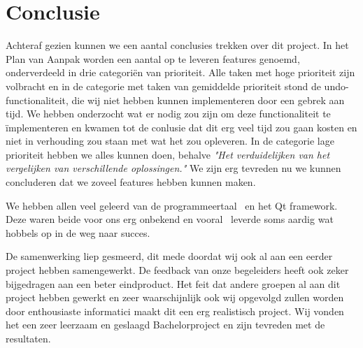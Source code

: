 \section{Conclusie}
Achteraf gezien kunnen we een aantal conclusies trekken over dit project. In het Plan van Aanpak worden een aantal op te leveren features genoemd, onderverdeeld in drie categori\"en van prioriteit. Alle taken met hoge prioriteit zijn volbracht en in de categorie met taken van gemiddelde prioriteit stond de undo-functionaliteit, die wij niet hebben kunnen implementeren door een gebrek aan tijd. We hebben onderzocht wat er nodig zou zijn om deze functionaliteit te \"implementeren en kwamen tot de conlusie dat dit erg veel tijd zou gaan kosten en niet in verhouding zou staan met wat het zou opleveren. In de categorie lage prioriteit hebben we alles kunnen doen, behalve \emph{"Het verduidelijken van het vergelijken van verschillende oplossingen."} We zijn erg tevreden nu we kunnen concluderen dat we zoveel features hebben kunnen maken.

We hebben allen veel geleerd van de programmeertaal \cpp\ en het Qt framework. Deze waren beide voor ons erg onbekend en vooral \cpp\ leverde soms aardig wat hobbels op in de weg naar succes. 

De samenwerking liep gesmeerd, dit mede doordat wij ook al aan een eerder project hebben samengewerkt. De feedback van onze begeleiders heeft ook zeker bijgedragen aan een beter eindproduct. Het feit dat andere groepen al aan dit project hebben gewerkt en zeer waarschijnlijk ook wij opgevolgd zullen worden door enthousiaste informatici maakt dit een erg realistisch project. Wij vonden het een zeer leerzaam en geslaagd Bachelorproject en zijn tevreden met de resultaten.
